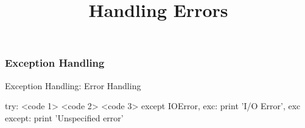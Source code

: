
\title{Handling Errors}

\frame{\maketitle}

\begin{frame}[fragile] %
\frametitle{Exception Handling}

\begin{block}{Exception Handling: Error Handling}
\begin{python}
try:
    <code 1>
    <code 2>
    <code 3>
except IOError, exc:
    print 'I/O Error', exc
except:
    print 'Unspecified error'
\end{python}
\end{block}
\end{frame}


